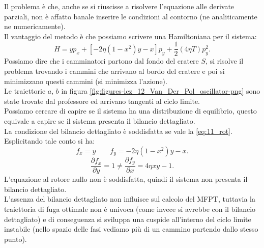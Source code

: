 Il problema è che, anche se si riuscisse a risolvere l'equazione alle derivate parziali, non è affatto banale inserire le condizioni al contorno (ne analiticamente ne numericamente).\\
Il vantaggio del metodo è che possiamo scrivere una Hamiltoniana per il sistema:
\[
    H = yp_x + \left[-2\eta (1-x^2) y - x\right]p_y + \frac{1}{2}(4\eta T) p_y^2
.\] 
Possiamo dire che i camminatori partono dal fondo del cratere $S$, si risolve il problema trovando i cammini che arrivano al bordo del cratere e poi si minimizzano questi cammini (si minimizza l'azione). \\
Le traiettorie $a$, $b$ in figura \ref{fig:figures-lez_12_Van_Der_Pol_oscillator-png} sono state trovate dal professore ed arrivano tangenti al ciclo limite.\\
Possiamo cercare di capire se il sistema ha una distribuzione di equilibrio, questo equivale a capire se il sistema presenta il bilancio dettagliato.\\
La condizione del bilancio dettagliato è soddisfatta se vale la \ref{eq:11_rot}. Esplicitando tale conto si ha:
\[
    f_x = y \qquad f_y = -2\eta (1-x^2) y - x
.\] 
\[
    \frac{\partial f_x}{\partial y} = 1 \neq \frac{\partial f_y}{\partial x} = 4\eta xy - 1
.\] 
L'equazione al rotore nullo non è soddisfatta, quindi il sistema non presenta il bilancio dettagliato.\\
L'assenza del bilancio dettagliato non influisce sul calcolo del MFPT, tuttavia la traiettoria di fuga ottimale non è univoca (come invece si avrebbe con il bilancio dettagliato) e di conseguenza si sviluppa una cuspide all'interno del ciclo limite instabile (nello spazio delle fasi vediamo più di un cammino partendo dallo stesso punto).
